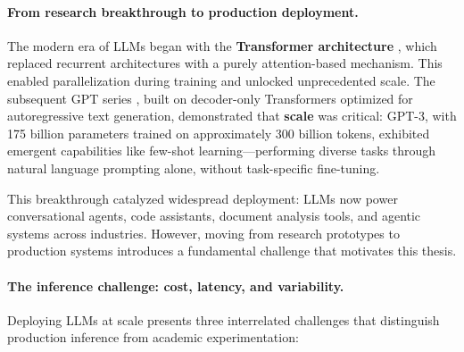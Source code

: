 \documentclass[english]{article}
\begin{document}
\paragraph{From research breakthrough to production deployment.}

The modern era of LLMs began with the \textbf{Transformer architecture} \parencite{vaswani2017attention}, which replaced recurrent architectures with a purely attention-based mechanism. This enabled parallelization during training and unlocked unprecedented scale. The subsequent GPT series \parencite{radford2018improving,radford2019language,brown2020language}, built on decoder-only Transformers optimized for autoregressive text generation, demonstrated that \textbf{scale} was critical: GPT-3, with 175 billion parameters trained on approximately 300 billion tokens, exhibited emergent capabilities like few-shot learning—performing diverse tasks through natural language prompting alone, without task-specific fine-tuning.

This breakthrough catalyzed widespread deployment: LLMs now power conversational agents, code assistants, document analysis tools, and agentic systems across industries. However, moving from research prototypes to production systems introduces a fundamental challenge that motivates this thesis.

\paragraph{The inference challenge: cost, latency, and variability.}

Deploying LLMs at scale presents three interrelated challenges that distinguish production inference from academic experimentation:
\end{document}
